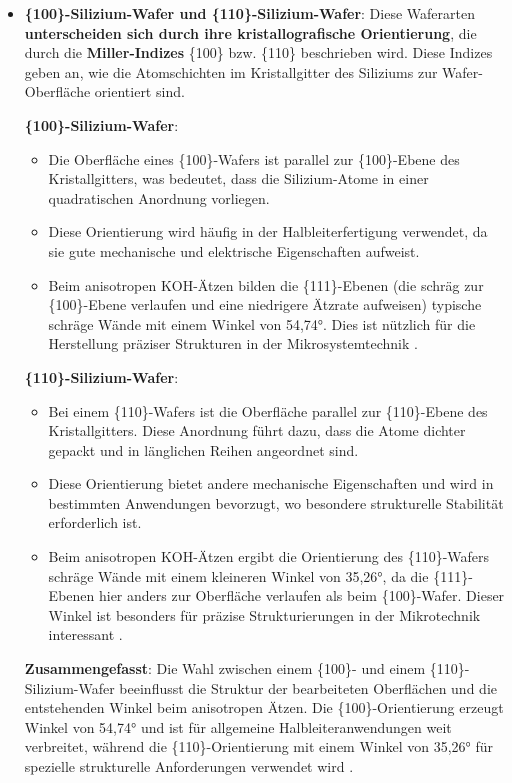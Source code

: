 \documentclass{article} %
\begin{document}
\begin{itemize}
    \item \textbf{\{100\}-Silizium-Wafer und \{110\}-Silizium-Wafer}: Diese Waferarten \textbf{unterscheiden sich durch ihre kristallografische Orientierung}, die durch die \textbf{Miller-Indizes} \{100\} bzw. \{110\} beschrieben wird. Diese Indizes geben an, wie die Atomschichten im Kristallgitter des Siliziums zur Wafer-Oberfläche orientiert sind.

    \textbf{\{100\}-Silizium-Wafer}:
    \begin{itemize}
        \item Die Oberfläche eines \{100\}-Wafers ist parallel zur \{100\}-Ebene des Kristallgitters, was bedeutet, dass die Silizium-Atome in einer quadratischen Anordnung vorliegen.
        \item Diese Orientierung wird häufig in der Halbleiterfertigung verwendet, da sie gute mechanische und elektrische Eigenschaften aufweist.
        \item Beim anisotropen KOH-Ätzen bilden die \{111\}-Ebenen (die schräg zur \{100\}-Ebene verlaufen und eine niedrigere Ätzrate aufweisen) typische schräge Wände mit einem Winkel von 54,74°. Dies ist nützlich für die Herstellung präziser Strukturen in der Mikrosystemtechnik \cite{madou2002}.
    \end{itemize}
    
    \textbf{\{110\}-Silizium-Wafer}:
    \begin{itemize}
        \item Bei einem \{110\}-Wafers ist die Oberfläche parallel zur \{110\}-Ebene des Kristallgitters. Diese Anordnung führt dazu, dass die Atome dichter gepackt und in länglichen Reihen angeordnet sind.
        \item Diese Orientierung bietet andere mechanische Eigenschaften und wird in bestimmten Anwendungen bevorzugt, wo besondere strukturelle Stabilität erforderlich ist.
        \item Beim anisotropen KOH-Ätzen ergibt die Orientierung des \{110\}-Wafers schräge Wände mit einem kleineren Winkel von 35,26°, da die \{111\}-Ebenen hier anders zur Oberfläche verlaufen als beim \{100\}-Wafer. Dieser Winkel ist besonders für präzise Strukturierungen in der Mikrotechnik interessant \cite{seidel1990}.
    \end{itemize}
    
    \textbf{Zusammengefasst}: Die Wahl zwischen einem \{100\}- und einem \{110\}-Silizium-Wafer beeinflusst die Struktur der bearbeiteten Oberflächen und die entstehenden Winkel beim anisotropen Ätzen. Die \{100\}-Orientierung erzeugt Winkel von 54,74° und ist für allgemeine Halbleiteranwendungen weit verbreitet, während die \{110\}-Orientierung mit einem Winkel von 35,26° für spezielle strukturelle Anforderungen verwendet wird \cite{kittel2004, ashcroft1976}.


\end{itemize}
\end{document}
